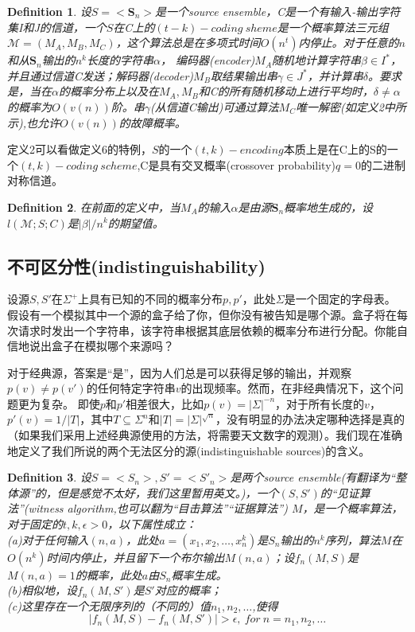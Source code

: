\documentclass[]{article}
\newtheorem{definition}{Definition}
\begin{document}
\begin{definition}
	设$S=<\textbf{S}_n>$是一个source ensemble，C是一个有输入-输出字符集I和J的信道，一个$S$在C上的$(t-k)-coding\ sheme$是一个概率算法三元组
	$\mathcal{M}=(M_A,M_B,M_C)$，这个算法总是在多项式时间$O(n^t)$内停止。对于任意的$n$和从$\textbf{S}_n$输出的$n^k$长度的字符串$\alpha$，
	编码器(encoder)$M_A$随机地计算字符串$\beta \in I^*$，并且通过信道C发送；解码器(decoder)$M_B$取结果输出串$\gamma \in J^*$，并计算串$\delta$。要求是，当在$\alpha$的概率分布上以及在$M_A,M_B$和C的所有随机移动上进行平均时，$\delta\neq \alpha$的概率为$O(v(n))$阶。串$\gamma$(从信道C输出)可通过算法$M_C$唯一解密(如定义2中所示),也允许$O(v(n))$的故障概率。
\end{definition}

定义2可以看做定义6的特例，$S$的一个$(t,k)-encoding$本质上是在C上的S的一个$(t,k)-coding\ scheme$,C是具有交叉概率(crossover probability)$q=0$的二进制对称信道。


\begin{definition}
	在前面的定义中，当$M_A$的输入$\alpha$是由源$\textbf{S}_n$概率地生成的，设$l(\mathcal{M};S;C)$是$|\beta|/n^k$的期望值。
\end{definition}

\subsection{不可区分性(indistinguishability)}

设源$S,S'$在$\Sigma^+$上具有已知的不同的概率分布$p,p'$，此处$\Sigma$是一个固定的字母表。
假设有一个模拟其中一个源的盒子给了你，但你没有被告知是哪个源。盒子将在每次请求时发出一个字符串，该字符串根据其底层依赖的概率分布进行分配。你能自信地说出盒子在模拟哪个来源吗？


对于经典源，答案是“是”，因为人们总是可以获得足够的输出，并观察$p(v)\neq p(v')$的任何特定字符串$v$的出现频率。然而，在非经典情况下，这个问题更为复杂。
即使$p$和$p'$相差很大，比如$p(v)=|\Sigma|^{-n}$，对于所有长度的$v$，$p'(v)=1/|T|$，其中$T\subseteq \Sigma^n$和$|T|=|\Sigma|^{\sqrt{n}}$，没有明显的办法决定哪种选择是真的（如果我们采用上述经典源使用的方法，将需要天文数字的观测）。我们现在准确地定义了我们所说的两个无法区分的源(indistinguishable sources)的含义。


\begin{definition}
	设$S=<S_n>,S'=<S'_n>$是两个source ensemble(有翻译为“整体源”的，但是感觉不太好，我们这里暂用英文。)，一个$(S,S')$的“见证算法”(witness algorithm,也可以翻为“目击算法”“证据算法”) $M$，是一个概率算法，对于固定的$t,k,\epsilon >0$，以下属性成立：\\
	(a)对于任何输入$(n,a)$，此处$a=(x_1,x_2,\ldots,x_n^k)$是$S_n$输出的$n^k$序列，算法$M$在$O(n^k)$时间内停止，并且留下一个布尔输出$M(n,a)$；设$f_n(M,S)$是$M(n,a)=1$的概率，此处$a$由$S_n$概率生成。\\
	(b)相似地，设$f_n(M,S')$是$S'$对应的概率；\\
	(c)这里存在一个无限序列的（不同的）值$n_1,n_2,\ldots$,使得
	\[|f_n(M,S)-f_n(M,S')|>\epsilon,\ for\ n=n_1,n_2,\ldots\]
\end{definition}
\end{document}
